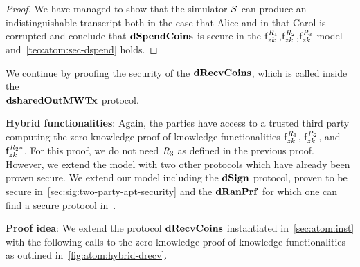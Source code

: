 \begin{proof}
    We have managed to show that the simulator $\mathcal{S}$ can produce an indistinguishable transcript both in the case that Alice and in that Carol is corrupted and conclude that $\mathbf{dSpendCoins}$ is secure in the $\mathsf{f}^{\mathit{R}_1}_{zk}$,$\mathsf{f}^{\mathit{R}_2}_{zk}$,$\mathsf{f}^{\mathit{R}_3}_{zk}$-model and~\cref{teo:atom:sec-dspend} holds.
\end{proof}

We continue by proofing the security of the $\mathbf{dRecvCoins}$, which is called inside the \\$\mathbf{dsharedOutMWTx}$ protocol.

\textbf{Hybrid functionalities}: Again, the parties have access to a trusted third party computing the zero-knowledge proof of knowledge functionalities $\mathsf{f}^{\mathit{R}_1}_{zk}$, $\mathsf{f}^{\mathit{R}_2}_{zk}$, and $\mathsf{f}^{\mathit{R}_2*}_{zk}$.
For this proof, we do not need $\mathit{R}_3$ as defined in the previous proof.
However, we extend the model with two other protocols which have already been proven secure.
We extend our model including the $\mathbf{dSign}$ protocol, proven to be secure in~\cref{sec:sig:two-party-apt-security} and the $\mathbf{dRanPrf}$ for which one can find a secure protocol in~\cite{klinec2020privacy}.

\textbf{Proof idea}: We extend the protocol $\mathbf{dRecvCoins}$ instantiated in~\cref{sec:atom:inst} with the following calls to the zero-knowledge proof of knowledge functionalities as outlined in~\cref{fig:atom:hybrid-drecv}.

